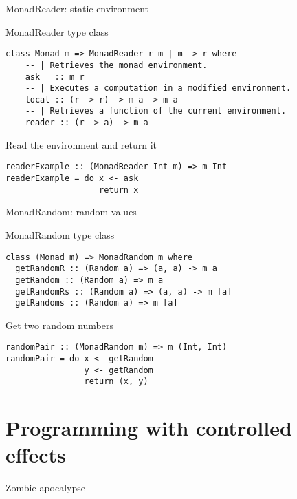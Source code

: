 \begin{frame}[fragile]{MonadReader: static environment}
  \begin{block}{MonadReader type class}
  \begin{verbatim}
class Monad m => MonadReader r m | m -> r where
    -- | Retrieves the monad environment.
    ask   :: m r
    -- | Executes a computation in a modified environment.
    local :: (r -> r) -> m a -> m a
    -- | Retrieves a function of the current environment.
    reader :: (r -> a) -> m a
  \end{verbatim}
  \end{block}
  \pause
  \begin{block}{Read the environment and return it}
  \begin{verbatim}
readerExample :: (MonadReader Int m) => m Int
readerExample = do x <- ask
                   return x
  \end{verbatim}
  \end{block}
\end{frame}

\begin{frame}[fragile]{MonadRandom: random values}
  \begin{block}{MonadRandom type class}
  \begin{verbatim}
class (Monad m) => MonadRandom m where
  getRandomR :: (Random a) => (a, a) -> m a
  getRandom :: (Random a) => m a
  getRandomRs :: (Random a) => (a, a) -> m [a]
  getRandoms :: (Random a) => m [a]
  \end{verbatim}
  \end{block}
  \pause
  \begin{block}{Get two random numbers}
  \begin{verbatim}
randomPair :: (MonadRandom m) => m (Int, Int)
randomPair = do x <- getRandom
                y <- getRandom
                return (x, y)
  \end{verbatim}
  \end{block}
\end{frame}

\section{Programming with controlled effects}

\begin{frame}[fragile]{Zombie apocalypse}
  \begin{figure}
    \centering
    \def\svgwidth{\columnwidth}
    
\end{figure}
\end{frame}

